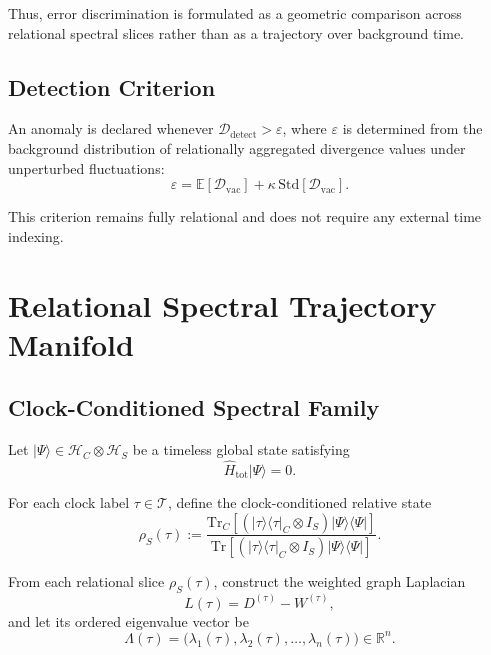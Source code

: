 \documentclass[11pt,a4paper]{article}
\theoremstyle{definition}
\theoremstyle{remark}
\begin{document}
Thus, error discrimination is formulated as a geometric comparison across relational spectral
slices rather than as a trajectory over background time.

\subsection{Detection Criterion}

An anomaly is declared whenever $\mathcal{D}_{\mathrm{detect}} > \varepsilon$, where
$\varepsilon$ is determined from the background distribution of relationally aggregated
divergence values under unperturbed fluctuations:
\begin{equation}
  \varepsilon
    = \mathbb{E}[\mathcal{D}_{\mathrm{vac}}]
      + \kappa\,\mathrm{Std}[\mathcal{D}_{\mathrm{vac}}].
\end{equation}

This criterion remains fully relational and does not require any external time indexing.

\section{Relational Spectral Trajectory Manifold}

\subsection{Clock-Conditioned Spectral Family}

Let $|\Psi\rangle \in \mathcal{H}_C \otimes \mathcal{H}_S$ be a timeless global state satisfying
\begin{equation}
\hat{H}_{\mathrm{tot}} |\Psi\rangle = 0.
\end{equation}

For each clock label $\tau \in \mathcal{T}$, define the clock-conditioned relative state
\begin{equation}
\rho_S(\tau)
:=
\frac{
\mathrm{Tr}_C \!\left[
\left(|\tau\rangle\langle\tau|_C \otimes I_S\right)
|\Psi\rangle\langle\Psi|
\right]
}{
\mathrm{Tr}\!\left[
\left(|\tau\rangle\langle\tau|_C \otimes I_S\right)
|\Psi\rangle\langle\Psi|
\right]
}.
\end{equation}

From each relational slice $\rho_S(\tau)$, construct the weighted graph Laplacian
\begin{equation}
L(\tau) = D^{(\tau)} - W^{(\tau)},
\end{equation}
and let its ordered eigenvalue vector be
\begin{equation}
\Lambda(\tau) = \bigl(\lambda_1(\tau), \lambda_2(\tau), \dots, \lambda_n(\tau)\bigr)
\in \mathbb{R}^n.
\end{equation}
\end{document}

